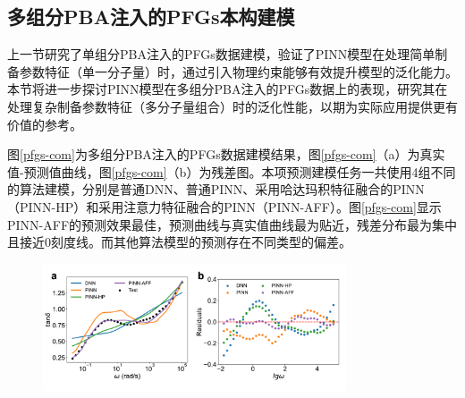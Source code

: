 \subsection{多组分PBA注入的PFGs本构建模}
上一节研究了单组分PBA注入的PFGs数据建模，验证了PINN模型在处理简单制备参数特征（单一分子量）时，通过引入物理约束能够有效提升模型的泛化能力。本节将进一步探讨PINN模型在多组分PBA注入的PFGs数据上的表现，研究其在处理复杂制备参数特征（多分子量组合）时的泛化性能，以期为实际应用提供更有价值的参考。

图\ref{pfgs-com}为多组分PBA注入的PFGs数据建模结果，图\ref{pfgs-com}（a）为真实值-预测值曲线，图\ref{pfgs-com}（b）为残差图。本项预测建模任务一共使用4组不同的算法建模，分别是普通DNN、普通PINN、采用哈达玛积特征融合的PINN（PINN-HP）和采用注意力特征融合的PINN（PINN-AFF）。图\ref{pfgs-com}显示PINN-AFF的预测效果最佳，预测曲线与真实值曲线最为贴近，残差分布最为集中且接近0刻度线。而其他算法模型的预测存在不同类型的偏差。
\begin{figure}[htbp]
  \centering
  \includegraphics[width=0.8\textwidth]{Fig/pfgs-com.pdf}
\end{figure}


